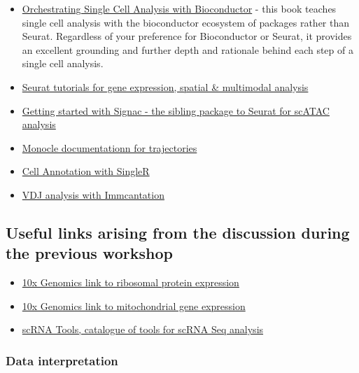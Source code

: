 \documentclass[
]{book}
\providecommand{\tightlist}{%
  \setlength{\itemsep}{0pt}\setlength{\parskip}{0pt}}
\begin{document}
\begin{itemize}
\tightlist
\item
  \href{https://bioconductor.org/books/release/OSCA/}{Orchestrating Single Cell Analysis with Bioconductor} - this book teaches single cell analysis with the bioconductor ecosystem of packages rather than Seurat. Regardless of your preference for Bioconductor or Seurat, it provides an excellent grounding and further depth and rationale behind each step of a single cell analysis.
\item
  \href{https://satijalab.org/seurat/articles/get_started.html}{Seurat tutorials for gene expression, spatial \& multimodal analysis}
\item
  \href{https://satijalab.org/signac/articles/overview.html}{Getting started with Signac - the sibling package to Seurat for scATAC analysis}
\item
  \href{https://cole-trapnell-lab.github.io/monocle3/docs/trajectories/}{Monocle documentationn for trajectories}
\item
  \href{http://bioconductor.org/books/devel/SingleRBook/}{Cell Annotation with SingleR}
\item
  \href{https://immcantation.readthedocs.io/en/stable/}{VDJ analysis with Immcantation}
\end{itemize}

\hypertarget{useful-links-arising-from-the-discussion-during-the-previous-workshop}{%
\subsection{Useful links arising from the discussion during the previous workshop}\label{useful-links-arising-from-the-discussion-during-the-previous-workshop}}

\begin{itemize}
\tightlist
\item
  \href{https://kb.10xgenomics.com/hc/en-us/articles/218169723-What-fraction-of-reads-map-to-ribosomal-proteins-}{10x Genomics link to ribosomal protein expression}
\item
  \href{https://kb.10xgenomics.com/hc/en-us/articles/360001086611-Why-do-I-see-a-high-level-of-mitochondrial-gene-expression-}{10x Genomics link to mitochondrial gene expression}
\item
  \href{https://www.scrna-tools.org/}{scRNA Tools, catalogue of tools for scRNA Seq analysis}
\end{itemize}

\hypertarget{data-interpretation}{%
\subsubsection{Data interpretation}\label{data-interpretation}}
\end{document}
